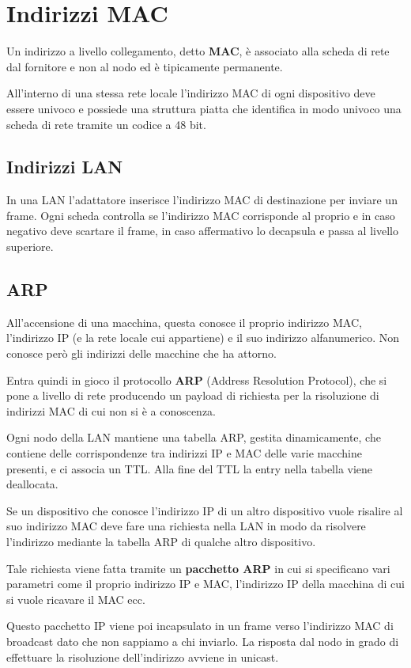 \section{Indirizzi MAC}
Un indirizzo a livello collegamento, detto \textbf{MAC}, è associato
alla scheda di rete dal fornitore e non al nodo ed è tipicamente 
permanente.

All'interno di una stessa rete locale l'indirizzo MAC di ogni 
dispositivo deve essere univoco e possiede una struttura piatta che 
identifica in modo univoco una scheda di rete tramite un codice a 48 
bit.

\subsection{Indirizzi LAN}
In una LAN l'adattatore inserisce l'indirizzo MAC di destinazione per
inviare un frame. Ogni scheda controlla se l'indirizzo MAC corrisponde
al proprio e in caso negativo deve scartare il frame, in caso 
affermativo lo decapsula e passa al livello superiore.

\subsection{ARP}
All'accensione di una macchina, questa conosce il proprio indirizzo 
MAC, l'indirizzo IP (e la rete locale cui appartiene) e il suo 
indirizzo alfanumerico. Non conosce però gli indirizzi delle macchine
che ha attorno.

Entra quindi in gioco il protocollo \textbf{ARP} (Address Resolution
Protocol), che si pone a livello di rete producendo un payload di
richiesta per la risoluzione di indirizzi MAC di cui non si è a 
conoscenza.

Ogni nodo della LAN mantiene una tabella ARP, gestita dinamicamente,
che contiene delle corrispondenze tra indirizzi IP e MAC delle
varie macchine presenti, e ci associa un TTL. Alla fine del TTL 
la entry nella tabella viene deallocata.

Se un dispositivo che conosce l'indirizzo IP di un altro dispositivo
vuole risalire al suo indirizzo MAC deve fare una richiesta nella LAN
in modo da risolvere l'indirizzo mediante la tabella ARP di qualche
altro dispositivo.

Tale richiesta viene fatta tramite un \textbf{pacchetto ARP} in cui
si specificano vari parametri come il proprio indirizzo IP e MAC,
l'indirizzo IP della macchina di cui si vuole ricavare il MAC ecc.

Questo pacchetto IP viene poi incapsulato in un frame verso
l'indirizzo MAC di broadcast dato che non sappiamo a chi inviarlo.
La risposta dal nodo in grado di effettuare la risoluzione 
dell'indirizzo avviene in unicast.
